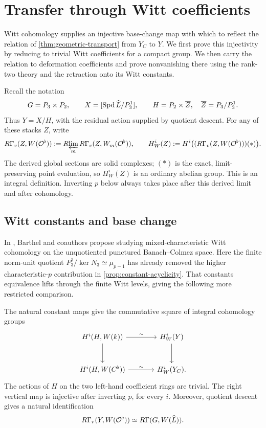 \section{Transfer through Witt coefficients}
\label{sec:witt-transfer}

Witt cohomology supplies an injective base-change map with which to
reflect the relation of \cref{thm:geometric-transport} from $Y_C$ to
$Y$. We first prove this injectivity by reducing to trivial Witt
coefficients for a compact group. We then carry the relation to
deformation coefficients and prove nonvanishing there using the
rank-two theory and the retraction onto its Witt constants.

Recall the notation
\[
 G=P_3\times P_2,\qquad
 X=[\operatorname{Spd}\widehat L/P_3^1],\qquad
 H=P_2\times\overline Z,
 \quad \overline Z=P_3/P_3^1.
\]
Thus $Y=X/H$, with the residual action supplied by quotient
descent.  For any of these stacks $Z$, write
\[
 R\Gamma_v(Z,W(\mathcal O^\flat))
   :=R\!\varprojlim_m R\Gamma_v(Z,W_m(\mathcal O^\flat)),
 \qquad
 H_W^i(Z):=H^i\bigl((R\Gamma_v(Z,W(\mathcal O^\flat)))(*)\bigr).
\]
The derived global sections are solid complexes; \((*)\) is the exact,
limit-preserving point evaluation, so \(H_W^i(Z)\) is an ordinary abelian
group. This is an integral definition. Inverting $p$ below always takes
place after this derived limit and after cohomology.

\subsection{Witt constants and base change}

In \cite[Remark~3.6.12(2)]{BMR2026}, Barthel and coauthors propose
studying mixed-characteristic Witt cohomology on the unquotiented
punctured Banach--Colmez space. Here the finite norm-unit quotient
$P_3^1/\ker N_3\simeq\mu_{p-1}$ has already removed the higher
characteristic-$p$ contribution in \cref{prop:constant-acyclicity}.
That constants equivalence lifts through the finite Witt levels,
giving the following more restricted comparison.

\begin{proposition}\label{prop:witt-comparison}
The natural constant maps give the commutative square of integral
cohomology groups
\begin{equation}\label{eq:witt-square}
\begin{tikzcd}[column sep=large,row sep=large]
 H^i(H,W(k)) \arrow[r,"\sim"] \arrow[d]
   & H_W^i(Y) \arrow[d]
   \\
 H^i(H,W(C^\flat)) \arrow[r,"\sim"]
   & H_W^i(Y_C).
\end{tikzcd}
\end{equation}
The actions of $H$ on the two left-hand coefficient rings are trivial.
The right vertical map is injective after inverting $p$, for every $i$.
Moreover, quotient descent gives a natural identification
\begin{equation}\label{eq:witt-group-identification}
 R\Gamma_v(Y,W(\mathcal O^\flat))
   \simeq R\Gamma(G,W(\widehat L)).
\end{equation}
\end{proposition}

